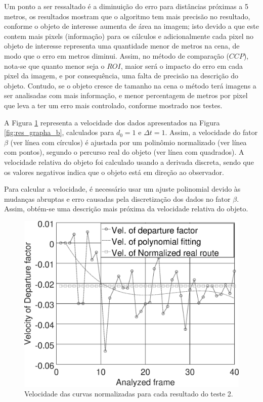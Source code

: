 Um ponto a ser ressaltado é a diminuição do erro para distâncias próximas a 5 metros,  
os resultados mostram que o algoritmo tem mais precisão no resultado, conforme o objeto de interesse 
aumenta de área na imagem; isto devido a que este contem mais pixels (informação)
para os cálculos e adicionalmente cada pixel no objeto de interesse 
representa uma quantidade menor de metros na cena, de modo que
o erro em metros diminui.
Assim, no método de comparação ($CCP$), nota-se que quanto menor seja o $ROI$, 
maior será o impacto do erro em cada pixel da imagem, 
e por consequência, uma falta de precisão na descrição do objeto. Contudo, se o objeto cresce de tamanho na cena
o método terá imagens a ser analisadas com mais informação, e menor percentagem de metros por pixel
que leva a ter um erro mais controlado, conforme
mostrado nos testes. 

A Figura \ref{fig:res_grapha_bv} representa a velocidade dos dados apresentados 
na Figura \ref{fig:res_grapha_b}, calculados para $d_0=1$ e $\Delta t=1$.
Assim, a velocidade do fator $\beta$ (ver línea com círculos) é ajustada por um polinômio
normalizado (ver línea com pontos), segundo o percurso real do objeto (ver línea com quadrados).
A velocidade relativa do objeto foi calculado usando a derivada
discreta, sendo que os valores negativos indica que o objeto está
em direção ao observador.

Para calcular a velocidade, é necessário usar um ajuste polinomial devido 
às mudanças abruptas e erro causadas pela discretização dos dados no fator $\beta$.
Assim, obtém-se uma descrição mais próxima da velocidade relativa do 
objeto.

\begin{figure}[H]
\includegraphics[width=\columnwidth]{images/graphvelocity.eps}
\caption{Velocidade das curvas normalizadas para cada resultado do teste 2.}
\label{fig:res_grapha_bv}
\end{figure}
